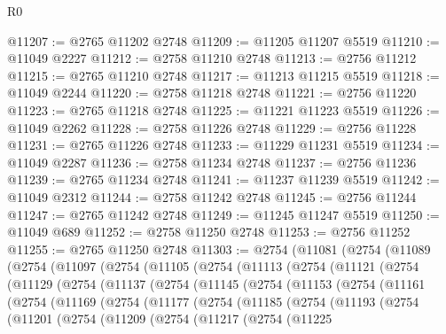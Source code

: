 \begin{lexlean}{R0}
\begin{coremodule}
@11207 := @2765 @11202 @2748
@11209 := @11205 @11207 @5519
@11210 := @11049 @2227
@11212 := @2758 @11210 @2748
@11213 := @2756 @11212
@11215 := @2765 @11210 @2748
@11217 := @11213 @11215 @5519
@11218 := @11049 @2244
@11220 := @2758 @11218 @2748
@11221 := @2756 @11220
@11223 := @2765 @11218 @2748
@11225 := @11221 @11223 @5519
@11226 := @11049 @2262
@11228 := @2758 @11226 @2748
@11229 := @2756 @11228
@11231 := @2765 @11226 @2748
@11233 := @11229 @11231 @5519
@11234 := @11049 @2287
@11236 := @2758 @11234 @2748
@11237 := @2756 @11236
@11239 := @2765 @11234 @2748
@11241 := @11237 @11239 @5519
@11242 := @11049 @2312
@11244 := @2758 @11242 @2748
@11245 := @2756 @11244
@11247 := @2765 @11242 @2748
@11249 := @11245 @11247 @5519
@11250 := @11049 @689
@11252 := @2758 @11250 @2748
@11253 := @2756 @11252
@11255 := @2765 @11250 @2748
@11303 := @2754
    (@11081
      (@2754
        (@11089
          (@2754
            (@11097
              (@2754
                (@11105
                  (@2754
                    (@11113
                      (@2754
                        (@11121
                          (@2754
                            (@11129
                              (@2754
                                (@11137
                                  (@2754
                                    (@11145
                                      (@2754
                                        (@11153
                                          (@2754
                                            (@11161
                                              (@2754
                                                (@11169
                                                  (@2754
                                                    (@11177
                                                      (@2754
                                                        (@11185
                                                          (@2754
                                                            (@11193
                                                              (@2754
                                                                (@11201
                                                                  (@2754
                                                                    (@11209
                                                                      (@2754
                                                                        (@11217
                                                                          (@2754
                                                                            (@11225

\end{coremodule}
\end{lexlean}
